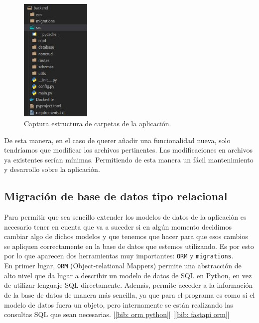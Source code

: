 \documentclass[a4paper, oneside, 12pt]{book}
\begin{document}
	\pagebreak
	
	\begin{figure}[h!]
		\begin{center}
			\includegraphics[width=0.3\textwidth]{img/folder_structure.jpg}
			\caption{Captura estructura de carpetas de la aplicación.}
			\label{img: folder structure}
		\end{center}
	\end{figure}

	\noindent De esta manera, en el caso de querer añadir una funcionalidad nueva, solo tendríamos que modificar los archivos pertinentes. Las modificaciones en archivos ya existentes serían mínimas. Permitiendo de esta manera un fácil mantenimiento y desarrollo sobre la aplicación. \\
	
	\subsection{Migración de base de datos tipo relacional}
	
	\noindent Para permitir que sea sencillo extender los modelos de datos de la aplicación es necesario tener en cuenta que va a suceder si en algún momento decidimos cambiar algo de dichos modelos y que tenemos que hacer para que esos cambios se apliquen correctamente en la base de datos que estemos utilizando. Es por esto por lo que aparecen dos herramientas muy importantes: \texttt{ORM} y \texttt{migrations}.  \\
	
	\noindent En primer lugar, \texttt{ORM} (Object-relational Mappers) permite una abstracción de alto nivel que da lugar a describir un modelo de datos de SQL en Python, en vez de utilizar lenguaje SQL directamente. Además, permite acceder a la información de la base de datos de manera más sencilla, ya que para el programa es como si el modelo de datos fuera un objeto, pero internamente se están realizando las consultas SQL que sean necesarias. [\ref{bib: orm python}] [\ref{bib: fastapi orm}] \\
	
\end{document}

